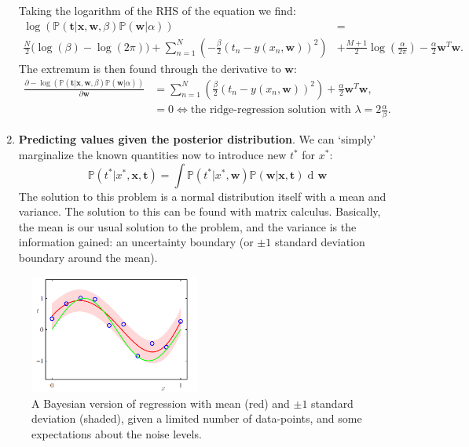 \documentclass{article}
\DeclareMathOperator{\di}{d\!}
\begin{document}
\begin{enumerate}
\begin{equation}
    \end{equation}
    Taking the logarithm of the RHS of the equation we find:
    \begin{align}
        \log\left( \mathbb{P}(\mathbf{t}|\mathbf{x},\mathbf{w},\beta)\mathbb{P}(\mathbf{w}|\alpha) \right) &=  \\
        \frac{N}{2}\bigg(\log(\beta) - \log(2\pi)\bigg) + \sum_{n=1}^N \left( -\frac{\beta}{2}(t_n-y(x_n,\mathbf{w}))^2          \right)& + \frac{M+1}{2}\log\left( \frac{\alpha}{2\pi} \right) - \frac{\alpha}{2}\mathbf{w}^T\mathbf{w}.
    \end{align}
    The extremum is then found through the derivative to $\mathbf{w}$:
    \begin{align}
        \frac{\partial -\log\left( \mathbb{P}(\mathbf{t}|\mathbf{x},\mathbf{w},\beta)\mathbb{P}(\mathbf{w}|\alpha) \right)}{\partial \mathbf{w}} &=  \sum_{n=1}^N \left( \frac{\beta}{2}(t_n-y(x_n,\mathbf{w}))^2          \right) + \frac{\alpha}{2}\mathbf{w}^T\mathbf{w}, \\
        &=0\Longleftrightarrow \text{the ridge-regression solution with }\lambda=2\frac{\alpha}{\beta}.
    \end{align}
    \item \textbf{Predicting values given the posterior distribution}. We can `simply' marginalize the known quantities now to introduce new $t^*$ for $x^*$:
    \begin{equation}
        \mathbb{P}(t^*|x^*,\mathbf{x},\mathbf{t}) = \int \mathbb{P}(t^*|x^*,\mathbf{w})\mathbb{P}(\mathbf{w}|\mathbf{x},\mathbf{t}) \di \mathbf{w}
    \end{equation}
    The solution to this problem is a normal distribution itself with a mean and variance. The solution to this can be found with matrix calculus. Basically, the mean is our usual solution to the problem, and the variance is the information gained: an uncertainty boundary (or $\pm1$ standard deviation boundary around the mean).
\end{enumerate}
\begin{figure}
    \centering
    \includegraphics[width=0.5\textwidth]{bishop.png}
    \caption{A Bayesian version of regression with mean (red) and $\pm1$ standard deviation (shaded), given a limited number of data-points, and some expectations about the noise levels.}
    \label{fig:bayesregr}
\end{figure}
\end{document}
